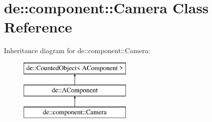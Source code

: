 \hypertarget{classde_1_1component_1_1_camera}{
\section{de\-:\-:component\-:\-:\-Camera \-Class \-Reference}
\label{classde_1_1component_1_1_camera}
}
\-Inheritance diagram for de\-:\-:component\-:\-:\-Camera\-:\begin{figure}[H]
\begin{center}
\leavevmode
\includegraphics[height=3.000000cm]{classde_1_1component_1_1_camera}
\end{center}
\end{figure}
